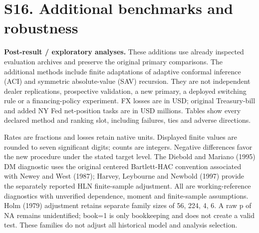 \documentclass[11pt,a4paper]{article}
\begin{document}
\section*{S16. Additional benchmarks and robustness}
\textbf{Post-result / exploratory analyses.} These additions use already inspected evaluation archives and preserve the original primary comparisons. The additional methods include finite adaptations of adaptive conformal inference (ACI) and symmetric absolute-value (SAV) recursion. They are not independent dealer replications, prospective validation, a new primary, a deployed switching rule or a financing-policy experiment. FX losses are in USD; original Treasury-bill and added NY Fed net-position tasks are in USD millions. Tables show every declared method and ranking slot, including failures, ties and adverse directions.

Rates are fractions and losses retain native units. Displayed finite values are rounded to seven significant digits; counts are integers. Negative differences favor the new procedure under the stated target level. The Diebold and Mariano (1995) DM diagnostic uses the original centered Bartlett-HAC convention associated with Newey and West (1987); Harvey, Leybourne and Newbold (1997) provide the separately reported HLN finite-sample adjustment. All are working-reference diagnostics with unverified dependence, moment and finite-sample assumptions. Holm (1979) adjustment retains separate family sizes of 56, 224, 4, 6. A raw p of NA remains unidentified; book=1 is only bookkeeping and does not create a valid test. These families do not adjust all historical model and analysis selection.
\end{document}
